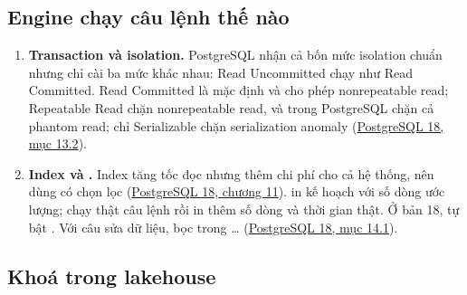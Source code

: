 \subsection{Engine chạy câu lệnh thế nào}

\begin{enumerate}[resume]
  \item \textbf{Transaction và isolation.} PostgreSQL nhận cả bốn mức isolation chuẩn nhưng chỉ cài ba mức khác nhau: Read Uncommitted chạy như Read Committed. Read Committed là mặc định và cho phép nonrepeatable read; Repeatable Read chặn nonrepeatable read, và trong PostgreSQL chặn cả phantom read; chỉ Serializable chặn serialization anomaly (\href{https://www.postgresql.org/docs/current/transaction-iso.html}{PostgreSQL 18, mục 13.2}).
  \item \textbf{Index và .} Index tăng tốc đọc nhưng thêm chi phí cho cả hệ thống, nên dùng có chọn lọc (\href{https://www.postgresql.org/docs/current/indexes.html}{PostgreSQL 18, chương 11}).  in kế hoạch với số dòng ước lượng;  chạy thật câu lệnh rồi in thêm số dòng và thời gian thật. Ở bản 18,  tự bật . Với câu sửa dữ liệu, bọc trong  …  (\href{https://www.postgresql.org/docs/current/using-explain.html}{PostgreSQL 18, mục 14.1}).
\end{enumerate}

\subsection{Khoá trong lakehouse}

